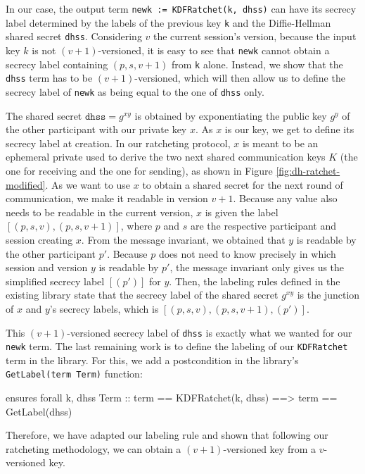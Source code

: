 In our case, the output term \texttt{newk := KDFRatchet(k, dhss)} can have its secrecy label determined by the labels of the previous key \texttt{k} and the Diffie-Hellman shared secret \texttt{dhss}.
Considering $v$ the current session's version, because the input key $k$ is not $(v+1)$-versioned, it is easy to see that \texttt{newk} cannot obtain a secrecy label containing $(p,s,v+1)$ from \texttt{k} alone.
Instead, we show that the \texttt{dhss} term has to be $(v+1)$-versioned, which will then allow us to define the secrecy label of \texttt{newk} as being equal to the one of \texttt{dhss} only.

The shared secret $\texttt{dhss} = g^{xy}$ is obtained by exponentiating the public key $g^y$ of the other participant with our private key $x$.
As $x$ is our key, we get to define its secrecy label at creation. 
In our ratcheting protocol, $x$ is meant to be an ephemeral private used to derive the two next shared communication keys $K$ (the one for receiving and the one for sending), as shown in Figure \ref{fig:dh-ratchet-modified}.
As we want to use $x$ to obtain a shared secret for the next round of communication, we make it readable in version $v+1$. Because any value also needs to be readable in the current version, $x$ is given the label $[(p,s,v),(p,s,v+1)]$, where $p$ and $s$ are the respective participant and session creating $x$.
From the message invariant, we obtained that $y$ is readable by the other participant $p'$. Because $p$ does not need to know precisely in which session and version $y$ is readable by $p'$, the message invariant only gives us the simplified secrecy label $[(p')]$ for $y$.
Then, the labeling rules defined in the existing library state that the secrecy label of the shared secret $g^{xy}$ is the junction of $x$ and $y$'s secrecy labels, which is $[(p,s,v),(p,s,v+1),(p')]$.

This $(v+1)$-versioned secrecy label of \texttt{dhss} is exactly what we wanted for our \texttt{newk} term.
The last remaining work is to define the labeling of our \texttt{KDFRatchet} term in the library. 
For this, we add a postcondition in the library's \texttt{GetLabel(term Term)} function:
\begin{gobra}
ensures forall k, dhss Term ::
    term == KDFRatchet(k, dhss) ==> term == GetLabel(dhss)
\end{gobra}
Therefore, we have adapted our labeling rule and shown that following our ratcheting methodology, we can obtain a $(v+1)$-versioned key from a $v$-versioned key.

